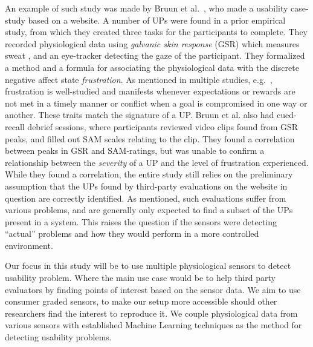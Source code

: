 An example of such study was made by Bruun et al.~\cite{LH-paper}, who made a usability case-study based on a website.
A number of UPs were found in a prior empirical study, from which they created three tasks for the participants to complete.
They recorded physiological data using \textit{galvanic skin response} (GSR) which measures sweat \cite{gsr_calibration}, and an eye-tracker detecting the gaze of the participant.
They formalized a method and a formula for associating the physiological data with the discrete negative affect state \textit{frustration}.
As mentioned in multiple studies, e.g.~\cite{LH-paper,frustration_with_computers}, frustration is well-studied
and manifests whenever expectations or rewards are not met in a timely manner or conflict when a goal is compromised in one way or another.
These traits match the signature of a UP.
Bruun et al. also had cued-recall debrief sessions, where participants reviewed video clips found from GSR peaks, and filled out SAM scales relating to the clip. 
They found a correlation between peaks in GSR and SAM-ratings, but was unable to confirm a relationship between the
\textit{severity} of a UP and the level of frustration experienced.
While they found a correlation, the entire study still relies on the preliminary assumption that the UPs found by
third-party evaluations on the website in question are correctly identified.
As mentioned, such evaluations suffer from various problems, and are generally only expected to find a subset of the UPs present in a system. 
This raises the question if the sensors were detecting ``actual'' problems and how they would perform in a more controlled environment.

Our focus in this study will be to use multiple physiological sensors to detect usability problem. Where the main use case would be to help third party evaluators by finding points of interest based on the sensor data. We aim to use consumer graded sensors, to make our setup more accessible should other researchers find the interest to reproduce
it. We couple physiological data from various sensors with established Machine Learning techniques as the method for
detecting usability problems.